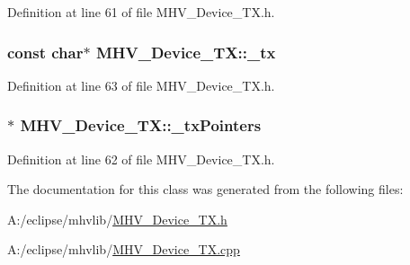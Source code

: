 \-Definition at line 61 of file \-M\-H\-V\-\_\-\-Device\-\_\-\-T\-X.\-h.

\hypertarget{class_m_h_v___device___t_x_ace8827a700dcc1a6a54e0bf80906085c}{
\subsubsection[{\-\_\-tx}]{\setlength{\rightskip}{0pt plus 5cm}const char$\ast$ {\bf \-M\-H\-V\-\_\-\-Device\-\_\-\-T\-X\-::\-\_\-tx}}}
\label{class_m_h_v___device___t_x_ace8827a700dcc1a6a54e0bf80906085c}


\-Definition at line 63 of file \-M\-H\-V\-\_\-\-Device\-\_\-\-T\-X.\-h.

\hypertarget{class_m_h_v___device___t_x_a54a8220b648f9e89a11e8273f91e75fb}{
\subsubsection[{\-\_\-tx\-Pointers}]{$\ast$ {\bf \-M\-H\-V\-\_\-\-Device\-\_\-\-T\-X\-::\-\_\-tx\-Pointers}}}
\label{class_m_h_v___device___t_x_a54a8220b648f9e89a11e8273f91e75fb}


\-Definition at line 62 of file \-M\-H\-V\-\_\-\-Device\-\_\-\-T\-X.\-h.



\-The documentation for this class was generated from the following files\-:\begin{DoxyCompactItemize}
\item 
\-A\-:/eclipse/mhvlib/\hyperlink{_m_h_v___device___t_x_8h}{\-M\-H\-V\-\_\-\-Device\-\_\-\-T\-X.\-h}\item 
\-A\-:/eclipse/mhvlib/\hyperlink{_m_h_v___device___t_x_8cpp}{\-M\-H\-V\-\_\-\-Device\-\_\-\-T\-X.\-cpp}\end{DoxyCompactItemize}
